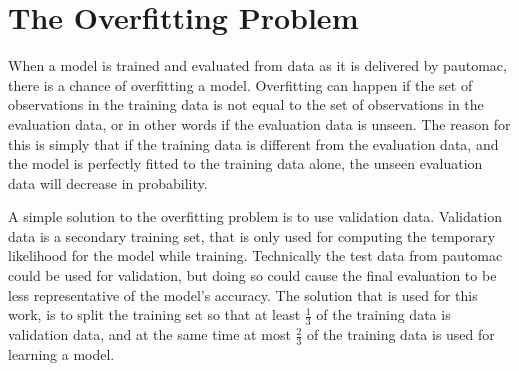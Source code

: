 \section{The Overfitting Problem}
When a model is trained and evaluated from data as it is delivered by pautomac, there is a chance of overfitting a model. Overfitting can happen if the set of observations in the training data is not equal to the set of observations in the evaluation data, or in other words if the evaluation data is unseen. The reason for this is simply that if the training data is different from the evaluation data, and the model is perfectly fitted to the training data alone, the unseen evaluation data will decrease in probability.

A simple solution to the overfitting problem is to use validation data. Validation data is a secondary training set, that is only used for computing the temporary likelihood for the model while training. Technically the test data from pautomac could be used for validation, but doing so could cause the final evaluation to be less representative of the model's accuracy. The solution that is used for this work, is to split the training set so that at least $\frac{1}{3}$ of the training data is validation data, and at the same time at most $\frac{2}{3}$ of the training data is used for learning a model.